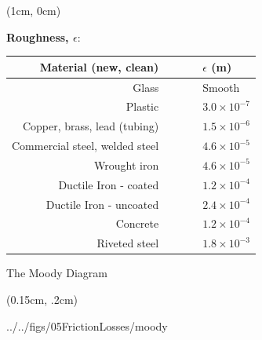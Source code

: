 \documentclass[9pt,xcolor={svgnames, x11names},professionalfonts, mathserif]{beamer}
\begin{document}
\begin{frame}
	
	
	\begin{textblock*}{1\columnwidth}(1cm, 0cm)
		\begin{center}
			\textbf{Roughness, $\epsilon$}:
			\parb
			\begin{tabular}{rrl}
				\toprule
				Material (new, clean)          & $\qquad$ & $\epsilon$ (m)     \\
				\midrule
				\midrule
				Glass                          &          & Smooth             \\
				\midrule
				Plastic                        &          & $3.0\times10^{-7}$ \\
				\midrule
				Copper, brass, lead (tubing)   &          & $1.5\times10^{-6}$ \\
				\midrule
				Commercial steel, welded steel &          & $4.6\times10^{-5}$ \\
				\midrule
				Wrought iron                   &          & $4.6\times10^{-5}$ \\
				\midrule
				Ductile Iron - coated          &          & $1.2\times10^{-4}$ \\
				\midrule
				Ductile Iron - uncoated        &          & $2.4\times10^{-4}$ \\
				\midrule
				Concrete                       &          & $1.2\times10^{-4}$ \\
				\midrule
				Riveted steel                  &          & $1.8\times10^{-3}$ \\
				\midrule
				\bottomrule
			\end{tabular}
			\par
		\end{center}
	\end{textblock*}
	
\end{frame}

\begin{frame}{The Moody Diagram}
	\begin{textblock*}{1\columnwidth}(0.15cm, .2cm)
		
		\begin{cfig}[0.6]{../../figs/05FrictionLosses/moody}\end{cfig}
	\end{textblock*}
\end{frame}
\end{document}
